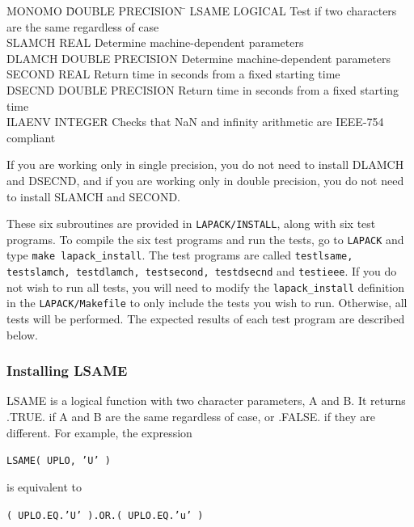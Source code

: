 \documentclass[11pt]{report}
\begin{document}
\begin{tabbing}
MONOMO  \=  DOUBLE PRECISION  \=  \kill
LSAME   \>  LOGICAL      \> Test if two characters are the same regardless of case \\
SLAMCH  \>  REAL  \> Determine machine-dependent parameters \\
DLAMCH  \>  DOUBLE PRECISION \> Determine machine-dependent parameters \\
SECOND  \>  REAL  \> Return time in seconds from a fixed starting time \\
DSECND  \>  DOUBLE PRECISION  \> Return time in seconds from a fixed starting time\\
ILAENV  \>  INTEGER \> Checks that NaN and infinity arithmetic are IEEE-754 compliant
\end{tabbing}

\noindent
If you are working only in single precision, you do not need to install
DLAMCH and DSECND, and if you are working only in double precision,
you do not need to install SLAMCH and SECOND.

These six subroutines are provided in \texttt{LAPACK/INSTALL},
along with six test programs.
To compile the six test programs and run the tests, go to \texttt{LAPACK} and
type \texttt{make lapack\_install}.  The test programs are called
\texttt{testlsame, testslamch, testdlamch, testsecond, testdsecnd} and
\texttt{testieee}.
If you do not wish to run all tests, you will need to modify the
\texttt{lapack\_install} definition in the \texttt{LAPACK/Makefile} to only include the
tests you wish to run.  Otherwise, all tests will be performed.
The expected results of each test program are described below.

\subsubsection{Installing LSAME}

LSAME is a logical function with two character parameters, A and B.
It returns .TRUE. if A and B are the same regardless of case, or .FALSE.
if they are different.
For example, the expression

\begin{list}{}{}
\item \texttt{LSAME( UPLO, 'U' )}
\end{list}
\noindent
is equivalent to
\begin{list}{}{}
\item \texttt{( UPLO.EQ.'U' ).OR.( UPLO.EQ.'u' )}
\end{list}
\end{document}

